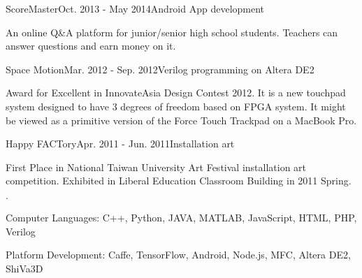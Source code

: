 \documentclass{joel_cv}
\begin{document}
\begin{sectionContentNormal}{ScoreMaster}{Oct. 2013 - May 2014}{Android App development}
	\item An online Q\&A platform for junior/senior high school students. Teachers can answer questions and earn money on it.
\end{sectionContentNormal}

\begin{sectionContentNormal}{Space Motion}{Mar. 2012 - Sep. 2012}{Verilog programming on Altera DE2}
	\item Award for Excellent in InnovateAsia Design Contest 2012. It is a new touchpad system designed to have 3 degrees of freedom based on FPGA system. It might be viewed as a primitive version of the Force Touch Trackpad on a MacBook Pro.
\end{sectionContentNormal}

\begin{sectionContentNormal}{Happy FACTory}{Apr. 2011 - Jun. 2011}{Installation art}
	\item First Place in National Taiwan University Art Festival installation art competition. Exhibited in Liberal Education Classroom Building in 2011 Spring.
\end{sectionContentNormal}

%
%

\begin{sectionItemize}{$\cdot$}
	\item Computer Languages: C++, Python, JAVA, MATLAB, JavaScript, HTML, PHP, Verilog
	\item Platform Development: Caffe, TensorFlow, Android, Node.js, MFC, Altera DE2, ShiVa3D
\end{sectionItemize}
\end{document}
